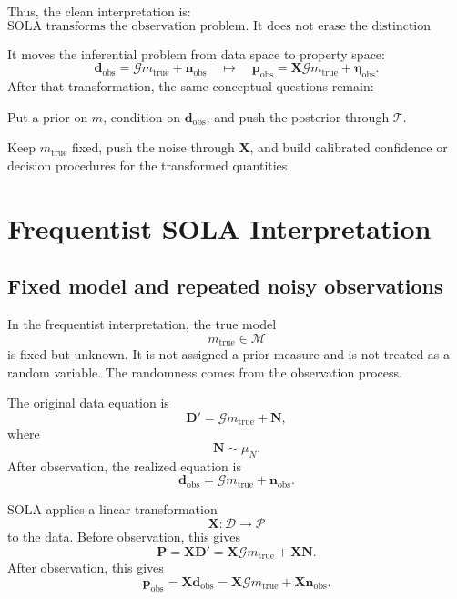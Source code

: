 \documentclass[11pt]{article}
\newcommand{\Mspace}{\mathcal M}
\newcommand{\Dspace}{\mathcal D}
\newcommand{\Pspace}{\mathcal P}
\newcommand{\muN}{\mu_N}
\newcommand{\Dobsrand}{\mathbf D'}
\newcommand{\Nrand}{\mathbf N}
\newcommand{\Prand}{\mathbf P}
\newcommand{\dobs}{\mathbf d_{\mathrm{obs}}}
\newcommand{\nobs}{\mathbf n_{\mathrm{obs}}}
\newcommand{\pobs}{\mathbf p_{\mathrm{obs}}}
\newcommand{\G}{\mathcal G}
\newcommand{\Tau}{\mathcal T}
\newcommand{\X}{\mathbf X}
\newcommand{\etarand}{\boldsymbol{\eta}}
\begin{document}
Thus, the clean interpretation is:
\[
    \boxed{
    \text{SOLA transforms the observation problem. It does not erase the distinction between Bayesian posterior probability and frequentist coverage.}
    }
\]

It moves the inferential problem from data space to property space:
\[
    \dobs=\G m_{\mathrm{true}}+\nobs
    \quad
    \longmapsto
    \quad
    \pobs=\X\G m_{\mathrm{true}}+\etarand_{\mathrm{obs}}.
\]
After that transformation, the same conceptual questions remain:
\begin{description}[leftmargin=3.5cm,style=nextline]
    \item[Bayesian route.]
    Put a prior on \(m\), condition on \(\dobs\), and push the posterior through \(\Tau\).

    \item[Frequentist route.]
    Keep \(m_{\mathrm{true}}\) fixed, push the noise through \(\X\), and build calibrated confidence or decision procedures for the transformed quantities.
\end{description}


\section{Frequentist SOLA Interpretation}

\subsection{Fixed model and repeated noisy observations}

In the frequentist interpretation, the true model
\[
    m_{\mathrm{true}}\in\Mspace
\]
is fixed but unknown. It is not assigned a prior measure and is not treated as a random variable. The randomness comes from the observation process.

The original data equation is
\[
    \Dobsrand
    =
    \G m_{\mathrm{true}}
    +
    \Nrand,
\]
where
\[
    \Nrand\sim\muN.
\]
After observation, the realized equation is
\[
    \dobs
    =
    \G m_{\mathrm{true}}
    +
    \nobs.
\]

SOLA applies a linear transformation
\[
    \X:\Dspace\to\Pspace
\]
to the data. Before observation, this gives
\[
    \Prand
    =
    \X\Dobsrand
    =
    \X\G m_{\mathrm{true}}
    +
    \X\Nrand.
\]
After observation, this gives
\[
    \pobs
    =
    \X\dobs
    =
    \X\G m_{\mathrm{true}}
    +
    \X\nobs.
\]
\end{document}

